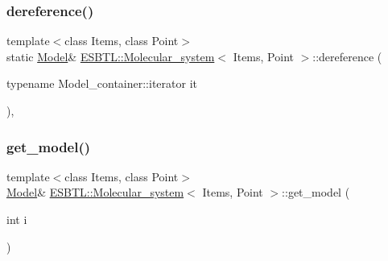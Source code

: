 \subsubsection{\texorpdfstring{dereference()}{dereference()}\hspace{0.1cm}{\footnotesize\ttfamily [2/2]}}
{\footnotesize\ttfamily template$<$class Items, class Point$>$ \\
static \hyperlink{classESBTL_1_1Molecular__system_ac99c9f22457fd0498324fb5cfc276227}{Model}\& \hyperlink{classESBTL_1_1Molecular__system}{E\+S\+B\+T\+L\+::\+Molecular\+\_\+system}$<$ Items, Point $>$\+::dereference (\begin{DoxyParamCaption}\item[{typename Model\+\_\+container\+::iterator}]{it }\end{DoxyParamCaption})\hspace{0.3cm}{\ttfamily [inline]}, {\ttfamily [static]}}

\mbox{\label{classESBTL_1_1Molecular__system_ab7fb99d805c8d4cbe9fa770c12313bc0}} 
\subsubsection{\texorpdfstring{get\+\_\+model()}{get\_model()}}
{\footnotesize\ttfamily template$<$class Items, class Point$>$ \\
\hyperlink{classESBTL_1_1Molecular__system_ac99c9f22457fd0498324fb5cfc276227}{Model}\& \hyperlink{classESBTL_1_1Molecular__system}{E\+S\+B\+T\+L\+::\+Molecular\+\_\+system}$<$ Items, Point $>$\+::get\+\_\+model (\begin{DoxyParamCaption}\item[{int}]{i }\end{DoxyParamCaption})\hspace{0.3cm}{\ttfamily [inline]}}

\mbox{\label{classESBTL_1_1Molecular__system_a2867e844dc082ca4a7a8072d541b034a}} 
